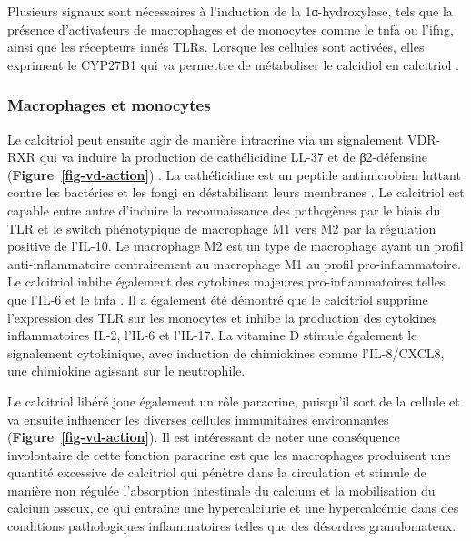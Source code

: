 \documentclass[
  a4paper,
  DIV=11,
  numbers=noendperiod,
  listof=totoc]{scrreprt}
\begin{document}
Plusieurs signaux sont nécessaires à l'induction de la 1α-hydroxylase,
tels que la présence d'activateurs de macrophages et de monocytes comme
le \ac{tnfa} ou l'\ac{ifng}, ainsi que les récepteurs innés \acp{TLR}.
Lorsque les cellules sont activées, elles expriment le \ac{CYP27B1} qui
va permettre de métaboliser le calcidiol en calcitriol
\autocite{Liu.2006,Charoenngam.2020}.

\hypertarget{macrophages-et-monocytes}{%
\subsubsection{Macrophages et
monocytes}\label{macrophages-et-monocytes}}

Le calcitriol peut ensuite agir de manière intracrine via un signalement
VDR-RXR qui va induire la production de cathélicidine LL-37 et de
β2-défensine (\textbf{Figure~\ref{fig-vd-action}})
\autocite{Caprio.2017}. La cathélicidine est un peptide antimicrobien
luttant contre les bactéries et les fongi en déstabilisant leurs
membranes \autocite{Charoenngam.2020}. Le calcitriol est capable entre
autre d'induire la reconnaissance des pathogènes par le biais du
\ac{TLR} et le switch phénotypique de macrophage M1 vers M2 par la
régulation positive de l'\ac{IL-10}. Le macrophage M2 est un type de
macrophage ayant un profil anti-inflammatoire contrairement au
macrophage M1 au profil pro-inflammatoire. Le calcitriol inhibe
également des cytokines majeures pro-inflammatoires telles que
l'\ac{IL-6} et le \ac{tnfa} \autocite{Meza-Meza.2022,Caprio.2017}. Il a
également été démontré que le calcitriol supprime l'expression des
\ac{TLR} sur les monocytes et inhibe la production des cytokines
inflammatoires \ac{IL-2}, l'\ac{IL-6} et l'\ac{IL-17}. La vitamine D
stimule également le signalement cytokinique, avec induction de
chimiokines comme l'IL-8/CXCL8, une chimiokine agissant sur le
neutrophile.

Le calcitriol libéré joue également un rôle paracrine, puisqu'il sort de
la cellule et va ensuite influencer les diverses cellules immunitaires
environnantes (\textbf{Figure~\ref{fig-vd-action}}). Il est intéressant
de noter une conséquence involontaire de cette fonction paracrine est
que les macrophages produisent une quantité excessive de calcitriol qui
pénètre dans la circulation et stimule de manière non régulée
l'absorption intestinale du calcium et la mobilisation du calcium
osseux, ce qui entraîne une hypercalciurie et une hypercalcémie dans des
conditions pathologiques inflammatoires telles que des désordres
granulomateux.
\end{document}
